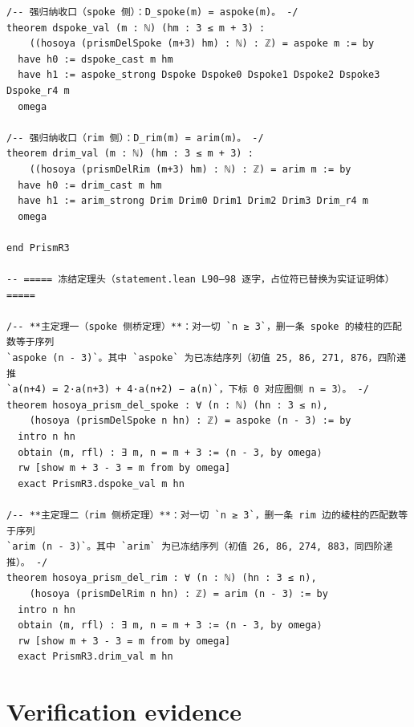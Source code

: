 \documentclass[11pt]{article}
\begin{document}
\begin{lstlisting}
/-- 强归纳收口（spoke 侧）：D_spoke(m) = aspoke(m)。 -/
theorem dspoke_val (m : ℕ) (hm : 3 ≤ m + 3) :
    ((hosoya (prismDelSpoke (m+3) hm) : ℕ) : ℤ) = aspoke m := by
  have h0 := dspoke_cast m hm
  have h1 := aspoke_strong Dspoke Dspoke0 Dspoke1 Dspoke2 Dspoke3 Dspoke_r4 m
  omega

/-- 强归纳收口（rim 侧）：D_rim(m) = arim(m)。 -/
theorem drim_val (m : ℕ) (hm : 3 ≤ m + 3) :
    ((hosoya (prismDelRim (m+3) hm) : ℕ) : ℤ) = arim m := by
  have h0 := drim_cast m hm
  have h1 := arim_strong Drim Drim0 Drim1 Drim2 Drim3 Drim_r4 m
  omega

end PrismR3

-- ===== 冻结定理头（statement.lean L90–98 逐字，占位符已替换为实证证明体） =====

/-- **主定理一（spoke 侧桥定理）**：对一切 `n ≥ 3`，删一条 spoke 的棱柱的匹配数等于序列
`aspoke (n - 3)`。其中 `aspoke` 为已冻结序列（初值 25, 86, 271, 876，四阶递推
`a(n+4) = 2·a(n+3) + 4·a(n+2) − a(n)`，下标 0 对应图侧 n = 3）。 -/
theorem hosoya_prism_del_spoke : ∀ (n : ℕ) (hn : 3 ≤ n),
    (hosoya (prismDelSpoke n hn) : ℤ) = aspoke (n - 3) := by
  intro n hn
  obtain ⟨m, rfl⟩ : ∃ m, n = m + 3 := ⟨n - 3, by omega⟩
  rw [show m + 3 - 3 = m from by omega]
  exact PrismR3.dspoke_val m hn

/-- **主定理二（rim 侧桥定理）**：对一切 `n ≥ 3`，删一条 rim 边的棱柱的匹配数等于序列
`arim (n - 3)`。其中 `arim` 为已冻结序列（初值 26, 86, 274, 883，同四阶递推）。 -/
theorem hosoya_prism_del_rim : ∀ (n : ℕ) (hn : 3 ≤ n),
    (hosoya (prismDelRim n hn) : ℤ) = arim (n - 3) := by
  intro n hn
  obtain ⟨m, rfl⟩ : ∃ m, n = m + 3 := ⟨n - 3, by omega⟩
  rw [show m + 3 - 3 = m from by omega]
  exact PrismR3.drim_val m hn

\end{lstlisting}

\section{Verification evidence}\label{sec:verif}
\end{document}
